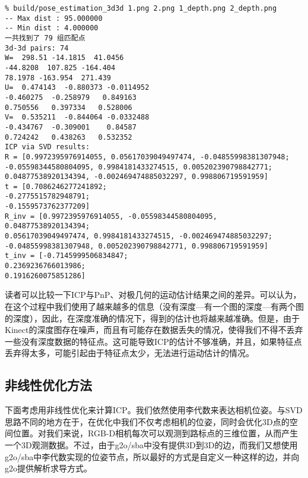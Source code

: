 \begin{lstlisting}
% build/pose_estimation_3d3d 1.png 2.png 1_depth.png 2_depth.png
-- Max dist : 95.000000 
-- Min dist : 4.000000 
一共找到了 79 组匹配点
3d-3d pairs: 74
W=  298.51 -14.1815  41.0456
-44.8208  107.825 -164.404
78.1978 -163.954  271.439
U=  0.474143  -0.880373 -0.0114952
-0.460275  -0.258979   0.849163
0.750556   0.397334   0.528006
V=  0.535211  -0.844064 -0.0332488
-0.434767  -0.309001    0.84587
0.724242   0.438263   0.532352
ICP via SVD results: 
R = [0.9972395976914055, 0.05617039049497474, -0.04855998381307948;
-0.05598344580804095, 0.9984181433274515, 0.005202390798842771;
0.04877538920134394, -0.002469474885032297, 0.998806719591959]
t = [0.7086246277241892;
-0.2775515782948791;
-0.1559573762377209]
R_inv = [0.9972395976914055, -0.05598344580804095, 0.04877538920134394;
0.05617039049497474, 0.9984181433274515, -0.002469474885032297;
-0.04855998381307948, 0.005202390798842771, 0.998806719591959]
t_inv = [-0.7145999506834847;
0.2369236766013986;
0.1916260075851286]
\end{lstlisting}

读者可以比较一下ICP与PnP、对极几何的运动估计结果之间的差异。可以认为，在这个过程中我们使用了越来越多的信息（没有深度—有一个图的深度—有两个图的深度），因此，在深度准确的情况下，得到的估计也将越来越准确。但是，由于Kinect的深度图存在噪声，而且有可能存在数据丢失的情况，使得我们不得不丢弃一些没有深度数据的特征点。这可能导致ICP的估计不够准确，并且，如果特征点丢弃得太多，可能引起由于特征点太少，无法进行运动估计的情况。

\subsection{非线性优化方法}
下面考虑用非线性优化来计算ICP。我们依然使用李代数来表达相机位姿。与SVD思路不同的地方在于，在优化中我们不仅考虑相机的位姿，同时会优化3D点的空间位置。对我们来说，RGB-D相机每次可以观测到路标点的三维位置，从而产生一个3D观测数据。不过，由于g2o/sba中没有提供3D到3D的边，而我们又想使用g2o/sba中李代数实现的位姿节点，所以最好的方式是自定义一种这样的边，并向g2o提供解析求导方式。

